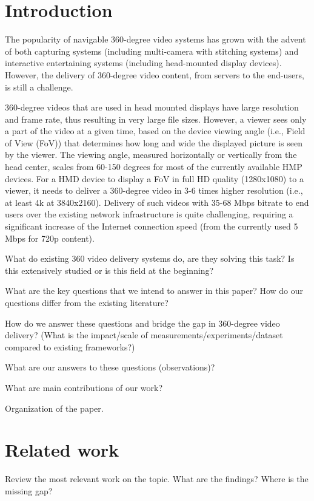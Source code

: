 \section{Introduction}

The popularity of navigable 360-degree video systems has grown with the advent of both capturing systems (including multi-camera with stitching systems) and interactive entertaining systems (including head-mounted display devices). However, the delivery of 360-degree video content, from servers to the end-users, is still a challenge.

360-degree videos that are used in head mounted displays have large resolution and frame rate, thus resulting in very large file sizes. However, a viewer sees only a part of the video at a given time, based on the device viewing angle (i.e., Field of View (FoV)) that determines how long and wide the displayed picture is seen by the viewer. The viewing angle, measured horizontally or vertically from the head center, scales from 60-150 degrees for most of the currently available HMP devices. For a HMD device to display a FoV in full HD quality (1280x1080) to a viewer, it needs to deliver a 360-degree video in 3-6 times higher resolution (i.e., at least 4k at 3840x2160). Delivery of such videos with 35-68 Mbps bitrate to end users over the existing network infrastructure is quite challenging, requiring a significant increase of the Internet connection speed (from the currently used 5 Mbps for 720p content).

What do existing 360 video delivery systems do, are they solving this task? Is this extensively studied or is this field at the beginning?

What are the key questions that we intend to answer in this paper? How do our questions differ from the existing literature?

How do we answer these questions and bridge the gap in 360-degree video delivery? (What is the impact/scale of measurements/experiments/dataset compared to existing frameworks?)

What are our answers to these questions (observations)?

What are main contributions of our work?

Organization of the paper.

\section{Related work}

Review the most relevant work on the topic. What are the findings? Where is the missing gap?

